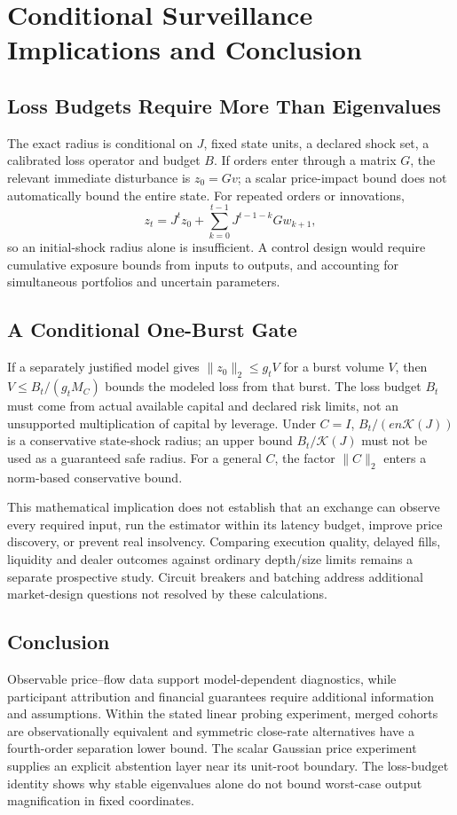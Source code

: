 \documentclass[12pt]{article}
\theoremstyle{definition}
\theoremstyle{remark}
\begin{document}
\section{Conditional Surveillance Implications and Conclusion}
\label{sec:policy_conclusion}
\subsection{Loss Budgets Require More Than Eigenvalues}
The exact radius is conditional on $J$, fixed state units, a declared shock set, a calibrated loss operator and budget $B$. If orders enter through a matrix $G$, the relevant immediate disturbance is $z_0=Gv$; a scalar price-impact bound does not automatically bound the entire state. For repeated orders or innovations,
\[
z_t=J^tz_0+\sum_{k=0}^{t-1}J^{t-1-k}Gw_{k+1},
\]
so an initial-shock radius alone is insufficient. A control design would require cumulative exposure bounds from inputs to outputs, and accounting for simultaneous portfolios and uncertain parameters.

\subsection{A Conditional One-Burst Gate}
If a separately justified model gives $\|z_0\|_2\le g_t V$ for a burst volume $V$, then $V\le B_t/(g_t M_C)$ bounds the modeled loss from that burst. The loss budget $B_t$ must come from actual available capital and declared risk limits, not an unsupported multiplication of capital by leverage. Under $C=I$, $B_t/(e n\mathcal K(J))$ is a conservative state-shock radius; an upper bound $B_t/\mathcal K(J)$ must not be used as a guaranteed safe radius. For a general $C$, the factor $\|C\|_2$ enters a norm-based conservative bound.

This mathematical implication does not establish that an exchange can observe every required input, run the estimator within its latency budget, improve price discovery, or prevent real insolvency. Comparing execution quality, delayed fills, liquidity and dealer outcomes against ordinary depth/size limits remains a separate prospective study. Circuit breakers and batching address additional market-design questions not resolved by these calculations.

\subsection{Conclusion}
Observable price--flow data support model-dependent diagnostics, while participant attribution and financial guarantees require additional information and assumptions. Within the stated linear probing experiment, merged cohorts are observationally equivalent and symmetric close-rate alternatives have a fourth-order separation lower bound. The scalar Gaussian price experiment supplies an explicit abstention layer near its unit-root boundary. The loss-budget identity shows why stable eigenvalues alone do not bound worst-case output magnification in fixed coordinates.
\end{document}
